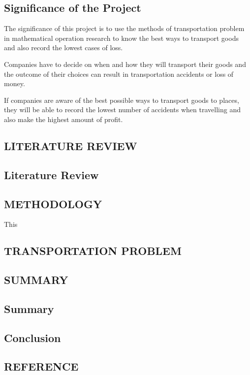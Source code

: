 \documentclass{article}
\begin{document}
\newpage

\begin{center}
\subsection{Significance of the Project}
\end{center}

The significance of this project is to use the methods of transportation problem in mathematical operation research to know the best ways to transport goods and also record the lowest cases of loss.

Companies have to decide on when and how they will transport their goods and the outcome of their choices can result in transportation accidents or loss of money. 

If companies are aware of the best possible ways to transport goods to places, they will be able to record the lowest number of accidents when travelling and also make the highest amount of profit.

\newpage

\begin{center}
	\section{LITERATURE REVIEW}
\end{center}
\subsection{Literature Review}

\newpage

\begin{center}
	\section{METHODOLOGY}
\end{center}

This 

\newpage

\begin{center}
	\section{TRANSPORTATION PROBLEM}
\end{center}

\newpage

\begin{center}
	\section{SUMMARY}
\end{center}
\subsection{Summary}
\subsection{Conclusion}

\newpage

\begin{center}
	\section{REFERENCE}
\end{center}
\end{document}

